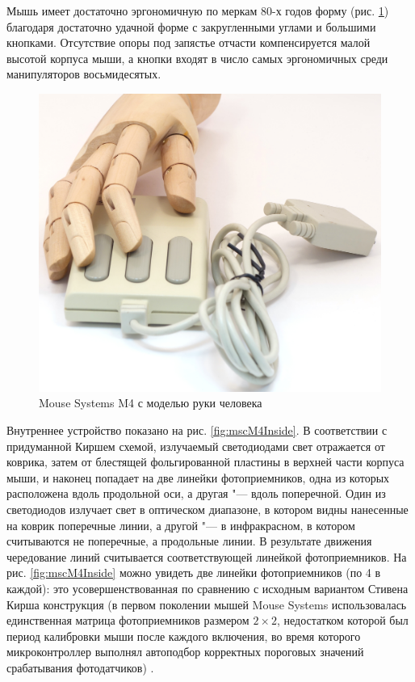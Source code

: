 \documentclass[11pt, a4paper]{article}
\begin{document}
Мышь имеет достаточно эргономичную по меркам 80-х годов форму (рис. \ref{fig:mscM4Hand}) благодаря достаточно удачной форме с закругленными углами и большими кнопками. Отсутствие опоры под запястье отчасти компенсируется малой высотой корпуса мыши, а кнопки входят в число самых эргономичных среди манипуляторов восьмидесятых.

\begin{figure}[h]
    \centering
    \includegraphics[scale=0.35]{1988_mouse_systems_m4/hand_30.jpg}
    \caption{Mouse Systems M4 с моделью руки человека}
    \label{fig:mscM4Hand}
\end{figure}

Внутреннее устройство показано на рис. \ref{fig:mscM4Inside}.
В соответствии с придуманной Киршем схемой, излучаемый светодиодами свет отражается от коврика, затем от блестящей фольгированной пластины в верхней части корпуса мыши, и наконец попадает на две линейки фотоприемников, одна из которых расположена вдоль продольной оси, а другая "--- вдоль поперечной. Один из светодиодов излучает свет в оптическом диапазоне, в котором видны нанесенные на коврик поперечные линии, а другой "--- в инфракрасном, в котором считываются не поперечные, а продольные линии. В результате движения чередование линий считывается соответствующей линейкой фотоприемников. На рис. \ref{fig:mscM4Inside} можно увидеть две линейки фотоприемников (по 4 в каждой): это  усовершенствованная по сравнению с исходным вариантом Стивена Кирша конструкция (в первом поколении мышей Mouse Systems использовалась единственная матрица фотоприемников размером $2 \times 2$, недостатком которой был период калибровки мыши после каждого включения, во время которого микроконтроллер выполнял автоподбор корректных пороговых значений срабатывания фотодатчиков) \cite{bio}.
\end{document}
